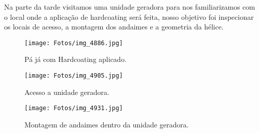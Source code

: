 \documentclass[a4paper,11pt,oneside,openany,brazilian,version=last,draft=false,]{main}
\begin{document}
\begin{twocolumn}
% 


Na parte da tarde visitamos uma unidade geradora para nos familiarizamos com o
local onde a aplicação de hardcoating será feita, nosso objetivo foi inspecionar
os locais de acesso, a montagem dos andaimes e a geometria da hélice.


\begin{figure}[H]
\centering
\texttt{[image: Fotos/img\_4886.jpg]}
\caption{Pá já com Hardcoating aplicado.}
\label{fig:gull}
\end{figure}
\begin{figure}[H]
\centering
\texttt{[image: Fotos/img\_4905.jpg]}
\caption{Acesso a unidade geradora.}
\end{figure}


% 







\begin{figure}[H]
\centering
\texttt{[image: Fotos/img\_4931.jpg]}
\caption{Montagem de andaimes dentro da unidade geradora.}
\end{figure}


\end{twocolumn}
\end{document}

